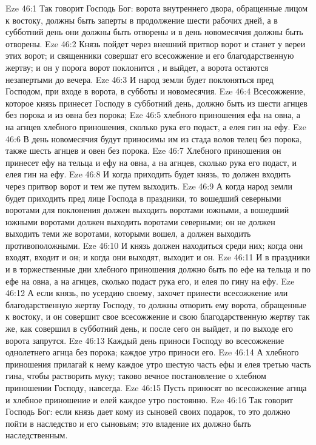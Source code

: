 \vs Eze 46:1 Так говорит Господь Бог: ворота внутреннего двора, обращенные лицом к востоку, должны быть заперты в продолжение шести рабочих дней, а в субботний день они должны быть отворены и в день новомесячия должны быть отворены.
\vs Eze 46:2 Князь пойдет через внешний притвор ворот и станет у вереи этих ворот; и священники совершат его всесожжение и его благодарственную жертву; и он у порога ворот поклонится , и выйдет, а ворота остаются незапертыми до вечера.
\vs Eze 46:3 И народ земли будет поклоняться пред Господом, при входе в ворота, в субботы и новомесячия.
\vs Eze 46:4 Всесожжение, которое князь принесет Господу в субботний день, должно быть из шести агнцев без порока и из овна без порока;
\vs Eze 46:5 хлебного приношения ефа на овна, а на агнцев хлебного приношения, сколько рука его подаст, а елея гин на ефу.
\vs Eze 46:6 В день новомесячия будут приносимы им из стада волов телец без порока, также шесть агнцев и овен без порока.
\vs Eze 46:7 Хлебного приношения он принесет ефу на тельца и ефу на овна, а на агнцев, сколько рука его подаст, и елея гин на ефу.
\vs Eze 46:8 И когда приходить будет князь, то должен входить через притвор ворот и тем же путем выходить.
\vs Eze 46:9 А когда народ земли будет приходить пред лице Господа в праздники, то вошедший северными воротами для поклонения должен выходить воротами южными, а вошедший южными воротами должен выходить воротами северными; он не должен выходить теми же воротами, которыми вошел, а должен выходить противоположными.
\vs Eze 46:10 И князь должен находиться среди них; когда они входят, входит и он; и когда они выходят, выходит и он.
\vs Eze 46:11 И в праздники и в торжественные дни хлебного приношения  должно быть по ефе на тельца и по ефе на овна, а на агнцев, сколько подаст рука его, и елея по гину на ефу.
\vs Eze 46:12 А если князь, по усердию своему, захочет принести всесожжение или благодарственную жертву Господу, то должны отворить ему ворота, обращенные к востоку, и он совершит свое всесожжение и свою благодарственную жертву так же, как совершил в субботний день, и после сего он выйдет, и по выходе его ворота запрутся.
\vs Eze 46:13 Каждый день приноси Господу во всесожжение однолетнего агнца без порока; каждое утро приноси его.
\vs Eze 46:14 А хлебного приношения прилагай к нему каждое утро шестую часть ефы и елея третью часть гина, чтобы растворить муку; таково вечное постановление о хлебном приношении Господу, навсегда.
\vs Eze 46:15 Пусть приносят во всесожжение агнца и хлебное приношение и елей каждое утро постоянно.
\vs Eze 46:16 Так говорит Господь Бог: если князь дает кому из сыновей своих подарок, то это должно пойти в наследство и его сыновьям; это владение их должно быть наследственным.
